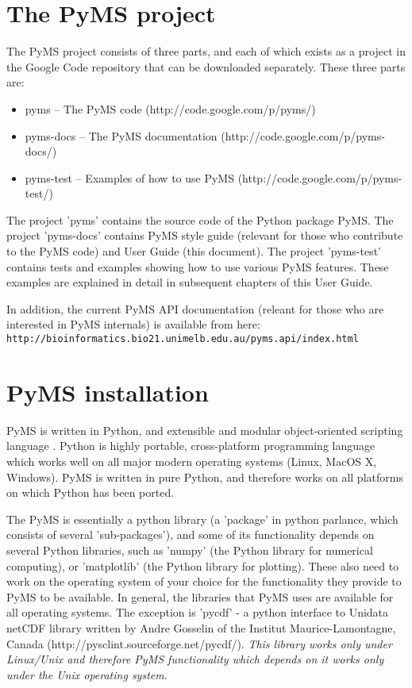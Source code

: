 \section{The PyMS project}

The PyMS project consists of three parts, and each of which exists
as a project in the Google Code repository that can be downloaded
separately. These three parts are:

\begin{itemize}
  \item pyms -- The PyMS code (http://code.google.com/p/pyms/)
  \item pyms-docs -- The PyMS documentation (http://code.google.com/p/pyms-docs/)
  \item pyms-test -- Examples of how to use PyMS (http://code.google.com/p/pyms-test/)
\end{itemize}

The project 'pyms' contains the source code of the Python package PyMS.
The project 'pyms-docs' contains PyMS style guide (relevant for those
who contribute to the PyMS code) and User Guide (this document). The
project 'pyms-test' contains tests and examples showing how to use
various PyMS features. These examples are explained in detail in 
subsequent chapters of this User Guide.

In addition, the current PyMS API documentation (releant for those
who are interested in PyMS internals) is available from here:\\
{\tt http://bioinformatics.bio21.unimelb.edu.au/pyms.api/index.html}\\

\section{PyMS installation}

PyMS is written in Python, and extensible and modular object-oriented
scripting language \cite{python}. Python is highly portable, cross-platform 
programming language which works well on all major modern operating
systems (Linux, MacOS X, Windows). PyMS is written in pure Python, and
therefore works on all platforms on which Python has been ported.

The PyMS is essentially a python library (a 'package' in python parlance,
which consists of several 'sub-packages'), and some of its functionality
depends on several Python libraries, such as 'numpy' (the Python library
for numerical computing), or 'matplotlib' (the Python library for plotting).
These also need to work on the operating system of your choice for the
functionality they provide to PyMS to be available. In general, the
libraries that PyMS uses are available for all operating systems. The
exception is 'pycdf' - a python interface to Unidata netCDF library
written by Andre Gosselin of the Institut Maurice-Lamontagne, Canada
(http://pysclint.sourceforge.net/pycdf/). {\em This library works only
under Linux/Unix and therefore PyMS functionality which depends on
it works only under the Unix operating system}.

